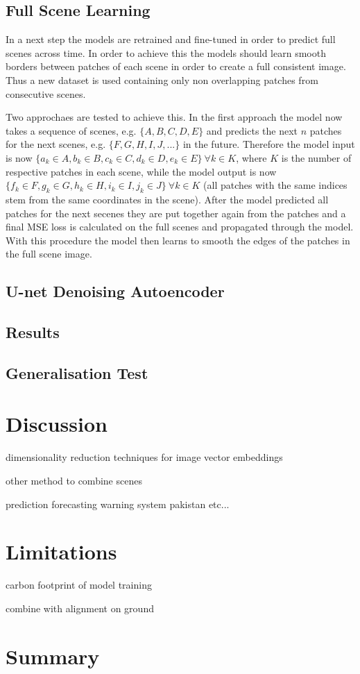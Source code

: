 \documentclass[12pt]{article}
\begin{document}
\subsection{Full Scene Learning}
 In a next step the models are retrained and fine-tuned in order to predict full scenes across time. In order to achieve this the models should learn smooth borders between patches of each scene in order to create a full consistent image. Thus a new dataset is used containing only non overlapping patches from consecutive scenes. 
 
 Two approchaes are tested to achieve this. In the first approach the model now takes a sequence of scenes, e.g. $\{A, B, C, D, E\}$ and predicts the next $n$ patches for the next scenes, e.g. $\{F, G, H, I, J, ...\}$ in the future. Therefore the model input is now $\{a_k \in A, b_k \in B, c_k \in C, d_k \in D, e_k \in E\} \ \forall k \in K$, where $K$ is the number of respective patches in each scene, while the model output is now $\{f_k \in F, g_k \in G, h_k \in H, i_k \in I, j_k \in J\} \ \forall k \in K$ (all patches with the same indices stem from the same coordinates in the scene). After the model predicted all patches for the next secenes they are put together again from the patches and a final MSE loss is calculated on the full scenes and propagated through the model. With this procedure the model then learns to smooth the edges of the patches in the full scene image.
\subsection{U-net Denoising Autoencoder}
 
 

\subsection{Results}
\subsection{Generalisation Test}

\section{Discussion}

dimensionality reduction techniques for image vector embeddings

other method to combine scenes

prediction forecasting warning system pakistan etc...
\section{Limitations}

carbon footprint of model training

combine with alignment on ground 

\section{Summary}





\newpage



\end{document}
